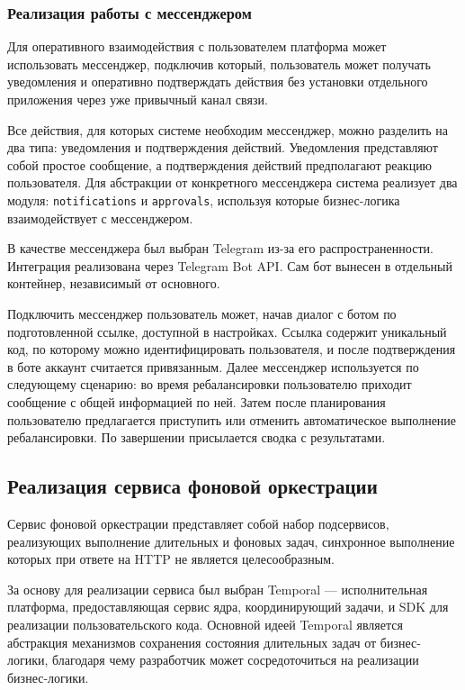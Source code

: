 \documentclass[14pt]{gost-7-32}
\begin{document}
\subsubsection{Реализация работы с мессенджером}
\label{sec:impl-messenger}

Для оперативного взаимодействия с пользователем платформа может использовать мессенджер, подключив который, пользователь может получать уведомления и оперативно подтверждать действия без установки отдельного приложения через уже привычный канал связи.

Все действия, для которых системе необходим мессенджер, можно разделить на два типа: уведомления и подтверждения действий. Уведомления представляют собой простое сообщение, а подтверждения действий предполагают реакцию пользователя. Для абстракции от конкретного мессенджера система реализует два модуля: \verb|notifications| и \verb|approvals|, используя которые бизнес-логика взаимодействует с мессенджером.

В качестве мессенджера был выбран Telegram из-за его распространенности. Интеграция реализована через Telegram Bot API. Сам бот вынесен в отдельный контейнер, независимый от основного.

Подключить мессенджер пользователь может, начав диалог с ботом по подготовленной ссылке, доступной в настройках. Ссылка содержит уникальный код, по которому можно идентифицировать пользователя, и после подтверждения в боте аккаунт считается привязанным. Далее мессенджер используется по следующему сценарию: во время ребалансировки пользователю приходит сообщение с общей информацией по ней. Затем после планирования пользователю предлагается приступить или отменить автоматическое выполнение ребалансировки. По завершении присылается сводка с результатами.

\subsection{Реализация сервиса фоновой оркестрации}
\label{sec:impl-orchestration}

Сервис фоновой оркестрации представляет собой набор подсервисов, реализующих выполнение длительных и фоновых задач, синхронное выполнение которых при ответе на HTTP не является целесообразным.

За основу для реализации сервиса был выбран Temporal --- исполнительная платформа, предоставляющая сервис ядра, координирующий задачи, и SDK для реализации пользовательского кода. Основной идеей Temporal является абстракция механизмов сохранения состояния длительных задач от бизнес-логики, благодаря чему разработчик может сосредоточиться на реализации бизнес-логики.
\end{document}
